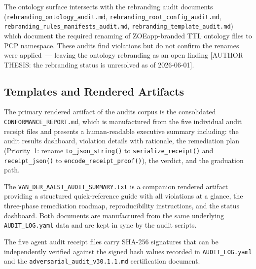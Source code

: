 The ontology surface intersects with the rebranding audit documents
(\texttt{rebranding\_ontology\_audit.md}, \texttt{rebranding\_root\_config\_audit.md},
\texttt{rebranding\_rules\_manifests\_audit.md}, \texttt{rebranding\_template\_audit.md})
which document the required renaming of ZOEapp-branded TTL ontology files to PCP
namespace. These audits find violations but do not confirm the renames were
applied~--- leaving the ontology rebranding as an open finding [AUTHOR THESIS:
the rebranding status is unresolved as of 2026-06-01].

\subsection{Templates and Rendered Artifacts}
\label{sec:audits-impl-templates}

The primary rendered artifact of the audits corpus is the consolidated
\texttt{CONFORMANCE\_REPORT.md}, which is manufactured from the five individual
audit receipt files and presents a human-readable executive summary including: the
audit results dashboard, violation details with rationale, the remediation plan
(Priority~1: rename \texttt{to\_json\_string()} to \texttt{serialize\_receipt()}
and \texttt{receipt\_json()} to \texttt{encode\_receipt\_proof()}), the verdict,
and the graduation path.

The \texttt{VAN\_DER\_AALST\_AUDIT\_SUMMARY.txt} is a companion rendered artifact
providing a structured quick-reference guide with all violations at a glance, the
three-phase remediation roadmap, reproducibility instructions, and the status
dashboard. Both documents are manufactured from the same underlying
\texttt{AUDIT\_LOG.yaml} data and are kept in sync by the audit scripts.

The five agent audit receipt files carry SHA-256 signatures that can be
independently verified against the signed hash values recorded in
\texttt{AUDIT\_LOG.yaml} and the \texttt{adversarial\_audit\_v30.1.1.md}
certification document.
